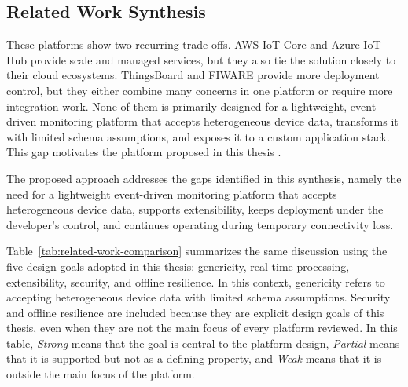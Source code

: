 \subsection{Related Work Synthesis}
These platforms show two recurring trade-offs. AWS IoT Core and Azure IoT Hub
provide scale and managed services, but they also tie the solution closely to
their cloud ecosystems. ThingsBoard and FIWARE provide more deployment control,
but they either combine many concerns in one platform or require more
integration work. None of them is primarily designed for a lightweight,
event-driven monitoring platform that accepts heterogeneous device data,
transforms it with limited schema assumptions, and exposes it to a custom
application stack. This gap motivates the platform proposed in this thesis \cite{panagou2025comprehensive, app12042172}.

The proposed approach addresses the gaps identified in this synthesis, namely
the need for a lightweight event-driven monitoring platform that accepts
heterogeneous device data, supports extensibility, keeps deployment under the
developer's control, and continues operating during temporary connectivity
loss.

Table~\ref{tab:related-work-comparison} summarizes the same discussion using
the five design goals adopted in this thesis: genericity, real-time
processing, extensibility, security, and offline resilience. In this context,
genericity refers to accepting heterogeneous device data with limited schema
assumptions. Security and offline resilience are included because they are
explicit design goals of this thesis, even when they are not the main focus of
every platform reviewed. In this table, \textit{Strong} means that the goal is
central to the platform design, \textit{Partial} means that it is supported but
not as a defining property, and \textit{Weak} means that it is outside the
main focus of the platform.

